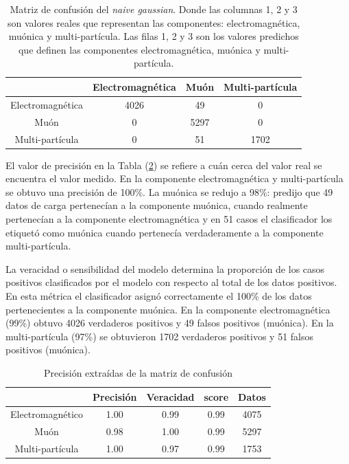 \begin{table}[t]
\begin{center}
\caption{Matriz de confusión del \textit{naive gaussian}. Donde las columnas 1, 2 y 3 son valores reales que representan las componentes: electromagnética, muónica y multi-partícula. Las filas 1, 2 y 3 son los valores predichos que definen las componentes electromagnética, muónica y multi-partícula.}
\begin{tabular}{| c | c | c | c | }
\hline
 & Electromagnética & Muón & Multi-partícula\\
 \hline
 Electromagnética & 4026 & 49 & 0\\
\hline
 Muón & 0 & 5297 & 0\\
\hline
Multi-partícula & 0 & 51 & 1702 \\
\hline

\end{tabular}
\label{mat}
\end{center}
\end{table}


El valor de precisión en la Tabla (\ref{pres}) se refiere a cuán cerca del valor real se encuentra el valor medido. En la componente electromagnética y multi-partícula se obtuvo una precisión de 100\%. La muónica se redujo a 98\%: predijo que 49 datos de carga pertenecían a la componente muónica, cuando realmente pertenecían a la componente electromagnética y en 51 casos el clasificador los etiquetó como muónica cuando pertenecía verdaderamente a la componente multi-partícula.

La veracidad o sensibilidad del modelo determina la proporción de los casos positivos clasificados por el modelo con respecto al total de los datos positivos. En esta métrica el clasificador asignó correctamente el 100\% de los datos pertenecientes a la componente muónica. En la componente electromagnética (99\%) obtuvo 4026 verdaderos positivos y 49 falsos positivos (muónica). En la multi-partícula (97\%) se obtuvieron 1702 verdaderos positivos y 51 falsos positivos (muónica).  


\begin{table}[t]
\begin{center}
\caption{Precisión extraídas de la matriz de confusión}
\begin{tabular}{| c | c | c | c | c |}
\hline
 & Precisión & Veracidad & score & Datos \\ \hline
Electromagnético & 1.00 & 0.99 & 0.99 & 4075 \\ \hline
Muón & 0.98 & 1.00 & 0.99 & 5297 \\  \hline
Multi-partícula & 1.00 & 0.97 & 0.99 & 1753 \\\hline

\end{tabular}
\label{pres}
\end{center}
\end{table}





